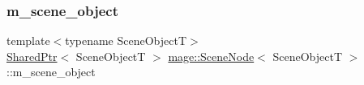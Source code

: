 \hypertarget{classmage_1_1_scene_node_aa05fbcdeb18d75170a5d5af70de995a9}{}\label{classmage_1_1_scene_node_aa05fbcdeb18d75170a5d5af70de995a9} 
\subsubsection{\texorpdfstring{m\+\_\+scene\+\_\+object}{m\_scene\_object}}
{\footnotesize\ttfamily template$<$typename Scene\+ObjectT$>$ \\
\hyperlink{namespacemage_a1e01ae66713838a7a67d30e44c67703e}{Shared\+Ptr}$<$ Scene\+ObjectT $>$ \hyperlink{classmage_1_1_scene_node}{mage\+::\+Scene\+Node}$<$ Scene\+ObjectT $>$\+::m\+\_\+scene\+\_\+object\hspace{0.3cm}{\ttfamily [private]}}

